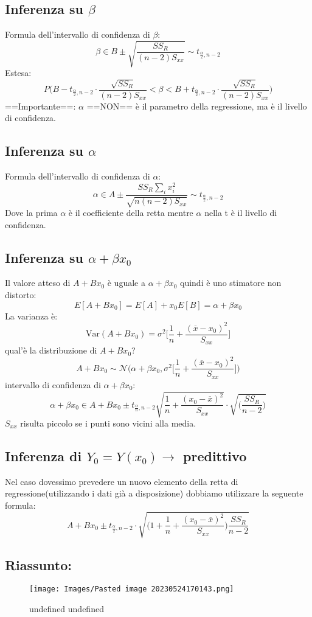 \subsection{Inferenza su $\beta$}\label{sec:inferenza-su-beta}
Formula dell'intervallo di confidenza di $\beta$:
\[
 \beta \in B \pm \sqrt{\frac{SS_R}{(n-2)S_{xx}}} \sim t_{\frac{\alpha}{2}, n-2}
\]
Estesa:
\[
 P\Big(B - t_{\frac{\alpha}{2},n-2} \cdot \frac{\sqrt{SS_R}}{(n-2)S_{xx}} < \beta < B + t_{\frac{\alpha}{2},n-2} \cdot \frac{\sqrt{SS_R}}{(n-2)S_{xx}}\Big) 
\]
==Importante==: $\alpha$ ==NON== è il parametro della regressione, ma è il livello di confidenza.
\subsection{Inferenza su $\alpha$}\label{sec:inferenza-su-alpha}
Formula dell'intervallo di confidenza di $\alpha$:
\[
 \alpha \in A \pm \frac{SS_R\sum_{i}{}x_i^2}{\sqrt{n(n-2)S_{xx}}} \sim t_{\frac{\alpha}{2},n-2}
\]
Dove la prima $\alpha$ è il coefficiente della retta mentre $\alpha$ nella t è il livello di confidenza.
\subsection{Inferenza su $\alpha + \beta x_0$}\label{sec:inferenza-su-alpha--beta-x_0}
Il valore atteso di $A + B x_0$ è uguale a $\alpha + \beta x_0$  quindi è uno stimatore non distorto:
\[
 E[A +B x_0] = E[A] + x_0E[B] = \alpha + \beta x_0 
\]
La varianza è:
\[
 \text{Var}(A+Bx_0) = \sigma^2 \Big[\frac{1}{n} + \frac{(\overline x - x_0)^2}{S_{xx}}  \Big] 
\]
qual'è la distribuzione di $A+Bx_0$?
\[
 A+Bx_0 \sim \mathcal N \Big(\alpha+\beta x_0, \sigma^2 \Big[ \frac{1}{n} + \frac{(\overline x - x_0)^2}{S_{xx}} \Big]\Big) 
\]
intervallo di confidenza di $\alpha + \beta x_0$:
\[
 \alpha + \beta x_0 \in A + B x_0 \pm t_{\frac{\alpha}{n}, n-2}\sqrt{\frac{1}{n} + \frac{(x_0- \overline x)^2}{S_{xx}}} \cdot \sqrt{\Big(\frac{SS_R}{n-2} \Big)}
\]
$S_{xx}$ risulta piccolo se i punti sono vicini alla media.
\subsection{Inferenza di $Y_0 = Y(x_0) \rightarrow$ predittivo}\label{sec:inferenza-di-y_0--yx_0-rightarrow-predittivo}
Nel caso dovessimo prevedere un nuovo elemento della retta di regressione(utilizzando i dati già a disposizione) dobbiamo utilizzare la seguente formula:
\[
 A+Bx_0 \pm t_{\frac{\alpha}{2},n-2} \cdot \sqrt{\Big(1+\frac{1}{n} + \frac{(x_0-\overline x)^2}{S_{xx}}\Big)\frac{SS_R}{n-2}} 
\]\subsection{Riassunto:}\label{sec:riassunto}
\begin{figure}
\texttt{[image: Images/Pasted image 20230524170143.png]}
\caption{undefined undefined}\n\end{figure}

